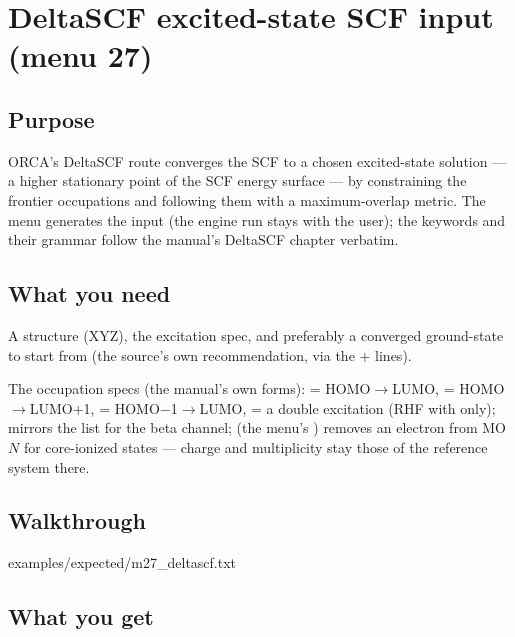 \chapter{DeltaSCF excited-state SCF input (menu 27)}
\label{ch:menu27}

\section{Purpose}

ORCA's DeltaSCF route converges the SCF to a chosen excited-state solution
--- a higher stationary point of the SCF energy surface --- by constraining
the frontier occupations and following them with a maximum-overlap metric.
The menu generates the input (the engine run stays with the user); the
keywords and their grammar follow the manual's DeltaSCF chapter verbatim.

\section{What you need}

A structure (XYZ), the excitation spec, and preferably a converged
ground-state  to start from (the source's own recommendation,
via the + lines).

The occupation specs (the manual's own forms):  =
HOMO$\to$LUMO,  = HOMO$\to$LUMO+1,  =
HOMO$-$1$\to$LUMO,  = a double excitation (RHF with
 only);  mirrors the list for the beta
channel;  (the menu's ) removes an
electron from MO $N$ for core-ionized states --- charge and multiplicity
stay those of the reference system there.

\section{Walkthrough}


  {examples/expected/m27_deltascf.txt}

\section{What you get}

